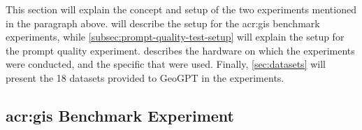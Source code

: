 
This section will explain the concept and setup of the two experiments mentioned in the paragraph above.  will describe the setup for the \acrshort{acr:gis} benchmark experiments, while \autoref{subsec:prompt-quality-test-setup} will explain the setup for the prompt quality experiment.  describes the hardware on which the experiments were conducted, and the specific  that were used. Finally, \autoref{sec:datasets} will present the 18 datasets provided to GeoGPT in the experiments.

\subsection[GIS Benchmark Experiment]{\acrshort{acr:gis} Benchmark Experiment}
\label{subsec:benchmarking-setup}



